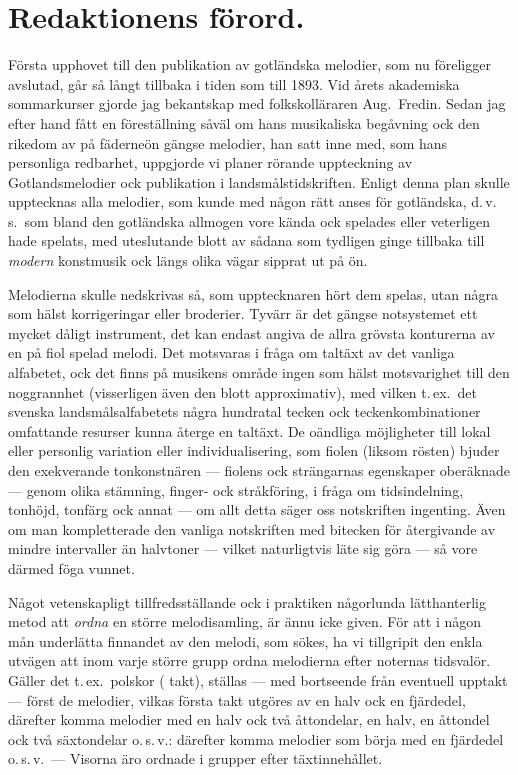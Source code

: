 \documentclass[a4paper,english]{article}
\begin{document}
\section{Redaktionens förord.}
Första upphovet till den publikation av gotländska melodier,
som nu föreligger avslutad, går så långt tillbaka i tiden som till
1893. Vid årets akademiska sommarkurser gjorde jag bekantskap
med folkskolläraren Aug.\ Fredin. Sedan jag efter hand fått en
föreställning såväl om hans musikaliska begåvning ock den rikedom
av på fäderneön gängse melodier, han satt inne med, som hans
personliga redbarhet, uppgjorde vi planer rörande uppteckning av
Gotlandsmelodier ock publikation i landsmålstidskriften. Enligt denna
plan skulle upptecknas alla melodier, som kunde med någon rätt
anses för gotländska, d.\,v.\,s.\ som bland den gotländska allmogen vore
kända ock spelades eller veterligen hade spelats, med uteslutande
blott av sådana som tydligen ginge tillbaka till \textit{modern} konstmusik
ock längs olika vägar sipprat ut på ön.

Melodierna skulle nedskrivas så, som upptecknaren hört dem
spelas, utan några som hälst korrigeringar eller broderier. Tyvärr
är det gängse notsystemet ett mycket dåligt instrument, det kan
endast angiva de allra grövsta konturerna av en på fiol spelad
melodi. Det motsvaras i fråga om taltäxt av det vanliga alfabetet,
ock det finns på musikens område ingen som hälst motsvarighet till
den noggrannhet (visserligen även den blott approximativ), med vilken
t.\,ex.\ det svenska landsmålsalfabetets några hundratal tecken ock
teckenkombinationer omfattande resurser kunna återge en taltäxt.
De oändliga möjligheter till lokal eller personlig variation eller
individualisering, som fiolen (liksom rösten) bjuder den exekverande
tonkonstnären --- fiolens ock strängarnas egenskaper oberäknade ---
genom olika stämning, finger- ock stråkföring, i fråga om tidsindelning,
tonhöjd, tonfärg ock annat --- om allt detta säger oss notskriften
ingenting. Även om man kompletterade den vanliga notskriften
med bitecken för återgivande av mindre intervaller än halvtoner ---
vilket naturligtvis läte sig göra --- så vore därmed föga vunnet.

Något vetenskapligt tillfredsställande ock i praktiken någorlunda
lätthanterlig metod att \textit{ordna} en större melodisamling, är
ännu icke given. För att i någon mån underlätta finnandet av den melodi,
som sökes, ha vi tillgripit den enkla utvägen att inom varje större
grupp ordna melodierna efter noternas tidsvalör. Gäller det t.\,ex.\ 
polskor ( takt), ställas --- med bortseende från eventuell upptakt
--- först de melodier, vilkas första takt utgöres av en halv ock en
fjärdedel, därefter komma melodier med en halv ock två åttondelar,
en halv, en åttondel ock två säxtondelar o.\,s.\,v.: därefter komma
melodier som börja med en fjärdedel o.\,s.\,v.\ --- Visorna äro
ordnade i grupper efter täxtinnehållet.
\end{document}
